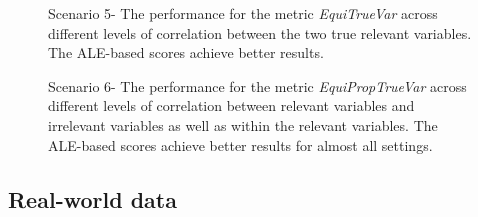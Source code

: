 \begin{figure}[ht!]
\centering
  \caption{Scenario 5- The performance for the metric \textit{EquiTrueVar} across different levels of correlation between the two true relevant variables. The ALE-based scores achieve better results.}
    \label{fig:equitruevar}
\end{figure}


\begin{figure}[ht!]
\centering
  \caption{Scenario 6- The performance for the metric \textit{EquiPropTrueVar} across different levels of correlation between relevant variables and irrelevant variables as well as within the relevant variables. The ALE-based scores achieve better results for almost all settings.}
    \label{fig:propequitruevar}
\end{figure}

\subsection{Real-world data}

